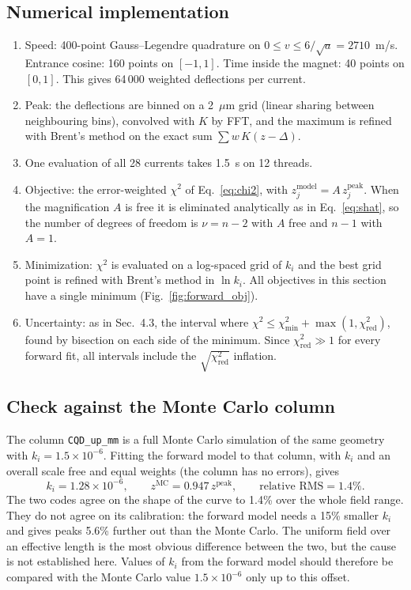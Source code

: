 \documentclass[11pt,a4paper]{article}
\newcommand{\kan}{k_i}
\begin{document}
\subsection{Numerical implementation}
\begin{enumerate}
\item Speed: 400-point Gauss--Legendre quadrature on $0\le v\le 6/\sqrt a = 2710$~m/s. Entrance cosine: 160 points on $[-1,1]$. Time inside the magnet: 40 points on $[0,1]$. This gives 64\,000 weighted deflections per current.
\item Peak: the deflections are binned on a 2~$\mu$m grid (linear sharing between neighbouring bins), convolved with $K$ by FFT, and the maximum is refined with Brent's method on the exact sum $\sum w\,K(z-\Delta)$.
\item One evaluation of all 28 currents takes 1.5~s on 12 threads.
\item Objective: the error-weighted $\chi^2$ of Eq.~\eqref{eq:chi2}, with $z^\text{model}_j = A\,z_j^\text{peak}$. When the magnification $A$ is free it is eliminated analytically as in Eq.~\eqref{eq:shat}, so the number of degrees of freedom is $\nu = n-2$ with $A$ free and $n-1$ with $A=1$.
\item Minimization: $\chi^2$ is evaluated on a log-spaced grid of $\kan$ and the best grid point is refined with Brent's method in $\ln\kan$. All objectives in this section have a single minimum (Fig.~\ref{fig:forward_obj}).
\item Uncertainty: as in Sec.~4.3, the interval where $\chi^2\le\chi^2_\text{min}+\max(1,\chi^2_\text{red})$, found by bisection on each side of the minimum. Since $\chi^2_\text{red}\gg1$ for every forward fit, all intervals include the $\sqrt{\chi^2_\text{red}}$ inflation.
\end{enumerate}

\subsection{Check against the Monte Carlo column}
The column \texttt{CQD\_up\_mm} is a full Monte Carlo simulation of the same geometry with $\kan = 1.5\times10^{-6}$. Fitting the forward model to that column, with $\kan$ and an overall scale free and equal weights (the column has no errors), gives
\[
\kan = 1.28\times10^{-6},\qquad z^\text{MC} = 0.947\,z^\text{peak},\qquad \text{relative RMS} = 1.4\%.
\]
The two codes agree on the shape of the curve to 1.4\% over the whole field range. They do not agree on its calibration: the forward model needs a 15\% smaller $\kan$ and gives peaks 5.6\% further out than the Monte Carlo. The uniform field over an effective length is the most obvious difference between the two, but the cause is not established here. Values of $\kan$ from the forward model should therefore be compared with the Monte Carlo value $1.5\times10^{-6}$ only up to this offset.
\end{document}
